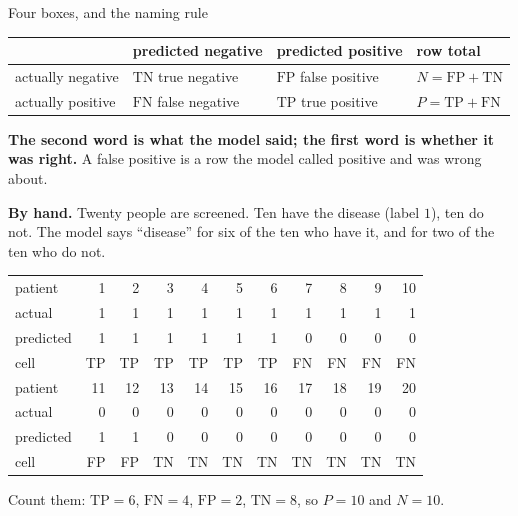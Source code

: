 \documentclass[aspectratio=169]{beamer}
\newcommand{\TP}{\mathrm{TP}}
\newcommand{\FP}{\mathrm{FP}}
\newcommand{\TN}{\mathrm{TN}}
\newcommand{\FN}{\mathrm{FN}}
\begin{document}
\begin{frame}[shrink=7]{Four boxes, and the naming rule}
  \begin{center}\small
  \begin{tabular}{@{}llll@{}}
    \toprule
     & predicted negative & predicted positive & row total\\
    \midrule
    actually negative & $\TN$ true negative  & $\FP$ false positive &
      $N = \FP + \TN$\\
    actually positive & $\FN$ false negative & $\TP$ true positive  &
      $P = \TP + \FN$\\
    \bottomrule
  \end{tabular}
  \end{center}
  \begin{exampleblock}{}
    \centering\small
    \textbf{The second word is what the model said; the first word is whether
    it was right.} A false positive is a row the model called positive and was
    wrong about.
  \end{exampleblock}
  \vspace{0.2em}
  \begin{center}\small
    \textbf{By hand.} Twenty people are screened. Ten have the disease (label
    $1$), ten do not. The model says ``disease'' for six of the ten who have
    it, and for two of the ten who do not.
  \end{center}
  \begin{center}\footnotesize
  \begin{tabular}{@{}lrrrrrrrrrr@{}}
    \toprule
    patient   & 1&2&3&4&5&6&7&8&9&10\\
    actual    & 1&1&1&1&1&1&1&1&1&1\\
    predicted & 1&1&1&1&1&1&0&0&0&0\\
    cell      & TP&TP&TP&TP&TP&TP&FN&FN&FN&FN\\
    \midrule
    patient   & 11&12&13&14&15&16&17&18&19&20\\
    actual    & 0&0&0&0&0&0&0&0&0&0\\
    predicted & 1&1&0&0&0&0&0&0&0&0\\
    cell      & FP&FP&TN&TN&TN&TN&TN&TN&TN&TN\\
    \bottomrule
  \end{tabular}
  \end{center}
  \begin{center}\small
    Count them: $\TP = 6$, $\FN = 4$, $\FP = 2$, $\TN = 8$, so $P = 10$ and
    $N = 10$.
  \end{center}
\end{frame}
\end{document}
